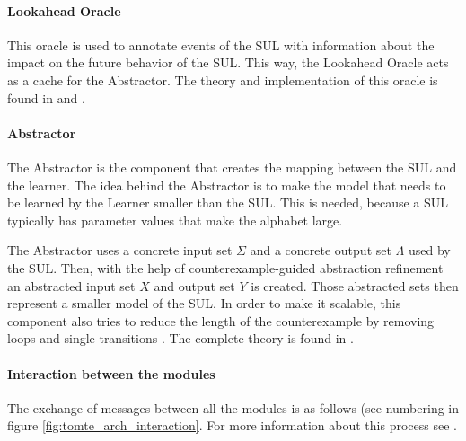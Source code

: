 \documentclass[multi,crop=false,class=article]{standalone}
\begin{document}
\paragraph{Lookahead Oracle} This oracle is used to annotate events of the SUL
with information about the impact on the future behavior of the SUL. This way,
the Lookahead Oracle acts as a cache for the Abstractor. The theory and
implementation of this oracle is found in \cite[p. 170]{Aarts2014} and
\cite[p. 105]{Tomte2014}.

\paragraph{Abstractor} The Abstractor is the component that creates the mapping
between the SUL and the learner. The idea behind the Abstractor is to make the
model that needs to be learned by the Learner smaller than the SUL. This is
needed, because a SUL typically has parameter values that make the alphabet
large.

The Abstractor uses a concrete input set $\Sigma$ and a concrete
output set $\Lambda$ used by the SUL. Then, with the help of
counterexample-guided abstraction refinement\cite[p. 104]{Tomte2014} an
abstracted input set $X$ and output set $Y$ is created. Those abstracted sets
then represent a smaller model of the SUL. In order to make it scalable, this
component also tries to reduce the length of the counterexample by removing
loops and single transitions \cite{Koopman2014}. The complete theory is found
in \cite{Tomte2014}.

\paragraph{Interaction between the modules} The exchange of messages between
all the modules is as follows (see numbering in figure
\ref{fig:tomte_arch_interaction}. For more information about this process see
\cite{Aarts2015,Tomte2014}.
\end{document}

